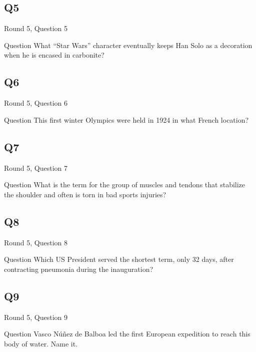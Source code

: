 \documentclass[11pt]{beamer}
\begin{document}
\subsection*{Q5}
\begin{frame}[t]{Round 5, Question 5}
\vspace{2em}
\begin{block}{Question}
What ``Star Wars'' character eventually keeps Han Solo as a decoration when he is encased in carbonite\@?
\end{block}
\end{frame}
    

\subsection*{Q6}
\begin{frame}[t]{Round 5, Question 6}
\vspace{2em}
\begin{block}{Question}
This first winter Olympics were held in 1924 in what French location\@?
\end{block}
\end{frame}
    

\subsection*{Q7}
\begin{frame}[t]{Round 5, Question 7}
\vspace{2em}
\begin{block}{Question}
What is the term for the group of muscles and tendons that stabilize the shoulder and often is torn in bad sports injuries\@?
\end{block}
\end{frame}
    

\subsection*{Q8}
\begin{frame}[t]{Round 5, Question 8}
\vspace{2em}
\begin{block}{Question}
Which US President served the shortest term, only 32 days, after contracting pneumonia during the inauguration\@?
\end{block}
\end{frame}
    

\subsection*{Q9}
\begin{frame}[t]{Round 5, Question 9}
\vspace{2em}
\begin{block}{Question}
Vasco Núñez de Balboa led the first European expedition to reach this body of water. Name it.
\end{block}
\end{frame}
    
\end{document}

